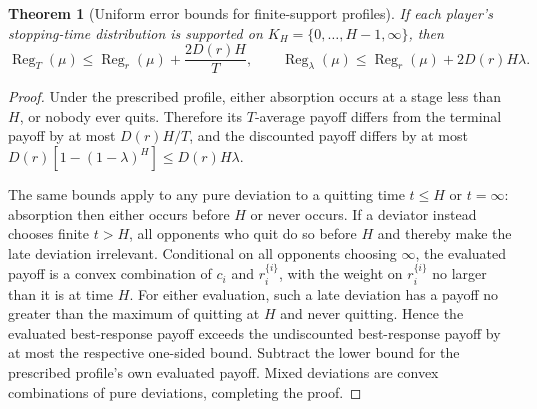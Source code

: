 \documentclass[11pt,a4paper]{article}
\numberwithin{equation}{section}
\theoremstyle{plain}
\newtheorem{theorem}{Theorem}[section]
\theoremstyle{definition}
\theoremstyle{remark}
\newcommand{\Reg}{\operatorname{Reg}}
\begin{document}
\begin{theorem}[Uniform error bounds for finite-support profiles]\label{thm:uniform}
If each player's stopping-time distribution is supported on
$K_H=\{0,\ldots,H-1,\infty\}$, then
\begin{equation}\label{eq:uniform-bound}
 \Reg_T(\mu)\le\Reg_r(\mu)+\frac{2D(r)H}{T},
 \qquad
 \Reg_\lambda(\mu)\le\Reg_r(\mu)+2D(r)H\lambda.
\end{equation}
\end{theorem}
\begin{proof}
Under the prescribed profile, either absorption occurs at a stage
less than $H$, or nobody ever quits. Therefore its $T$-average payoff
differs from the terminal payoff by at most $D(r)H/T$, and the
discounted payoff differs by at most
$D(r)[1-(1-\lambda)^H]\le D(r)H\lambda$.

The same bounds apply to any pure deviation to a quitting time
$t\le H$ or $t=\infty$: absorption then either occurs before $H$
or never occurs. If a deviator instead chooses finite $t>H$, all
opponents who quit do so before $H$ and thereby make the late
deviation irrelevant. Conditional on all opponents choosing $\infty$,
the evaluated payoff is a convex combination of $c_i$ and
$r_i^{\{i\}}$, with the weight on $r_i^{\{i\}}$ no larger than it is
at time $H$. For either evaluation, such a late deviation has a
payoff no greater than the maximum of quitting at $H$ and never
quitting. Hence the evaluated best-response payoff exceeds the
undiscounted best-response payoff by at most the respective one-sided
bound. Subtract the lower bound for the prescribed profile's own
evaluated payoff. Mixed deviations are convex combinations of pure
deviations, completing the proof.
\end{proof}
\end{document}
